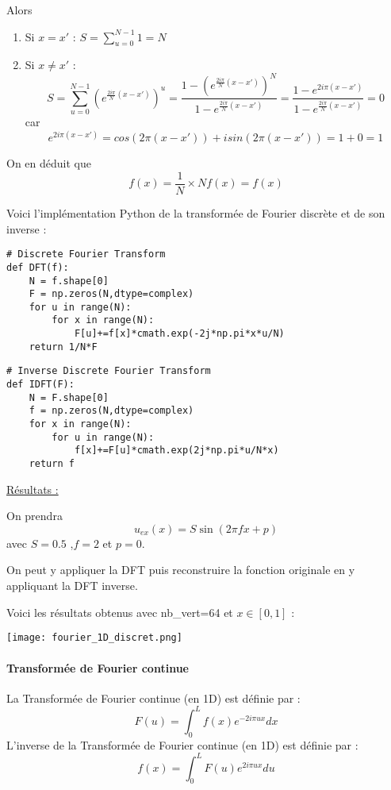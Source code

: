 Alors
\begin{enumerate}[label=\textbullet]
	\item Si $x=x'$ : $S=\sum_{u=0}^{N-1}1=N$
	\item Si $x\ne x'$ : 
	$$S=\sum_{u=0}^{N-1}\left(e^{\frac{2i\pi}{N}(x-x')}\right)^u=\frac{1-\left(e^{\frac{2i\pi}{N}(x-x')}\right)^N}{1-e^{\frac{2i\pi}{N}(x-x')}}=\frac{1-e^{2i\pi(x-x')}}{1-e^{\frac{2i\pi}{N}(x-x')}}=0$$
	car
	$$e^{2i\pi(x-x')}=cos(2\pi(x-x'))+i sin(2\pi(x-x')) = 1+0 =1$$
\end{enumerate}

On en déduit que
$$f(x)=\frac{1}{N}\times Nf(x)=f(x)$$

Voici l'implémentation Python de la transformée de Fourier discrète et de son inverse :

\lstset{style=Python}

\begin{lstlisting}
# Discrete Fourier Transform
def DFT(f): 
	N = f.shape[0]
	F = np.zeros(N,dtype=complex)
	for u in range(N):
		for x in range(N):
			F[u]+=f[x]*cmath.exp(-2j*np.pi*x*u/N)
	return 1/N*F
\end{lstlisting}
\begin{lstlisting}
# Inverse Discrete Fourier Transform
def IDFT(F): 
	N = F.shape[0]
	f = np.zeros(N,dtype=complex)
	for x in range(N):
		for u in range(N):
			f[x]+=F[u]*cmath.exp(2j*np.pi*u/N*x)
	return f
\end{lstlisting}

\underline{Résultats :}

On prendra
$$u_{ex}(x)=S\sin(2\pi fx + p)$$
avec $S=0.5$ ,$f=2$ et $p=0$.

On peut y appliquer la DFT puis reconstruire la fonction originale en y appliquant la DFT inverse. 

Voici les résultats obtenus avec nb\_vert=64 et $x\in[0,1]$ :

\begin{minipage}{\linewidth}
	\centering
	\texttt{[image: fourier\_1D\_discret.png]}
\end{minipage}

\paragraph{Transformée de Fourier continue \\}

\noindent La Transformée de Fourier continue (en 1D) est définie par :
$$F(u)=\int_{0}^{L}f(x)e^{-2i\pi ux}dx$$
L'inverse de la Transformée de Fourier continue (en 1D) est définie par :
$$f(x)=\int_{0}^{L}F(u)e^{2i\pi ux}du$$

